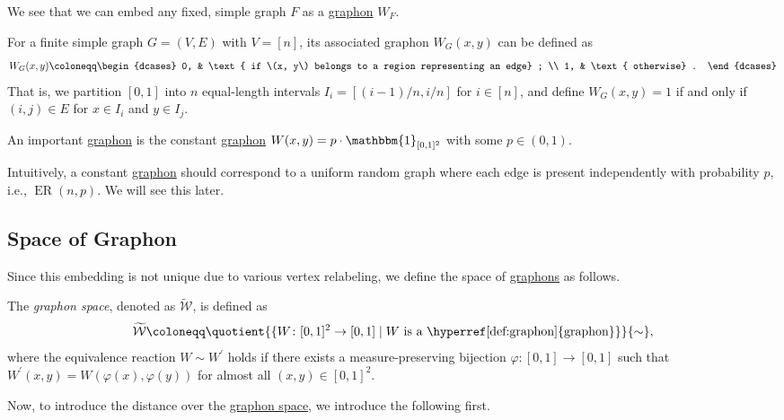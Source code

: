 We see that we can embed any fixed, simple graph \(F\) as a \hyperref[def:graphon]{graphon} \(W_F\).

\begin{eg}
	For a finite simple graph \(G = (V, E)\) with \(V = [n]\), its associated graphon \(W_G(x, y)\) can be defined as
	\[
		W_G(x, y)
		\coloneqq \begin{dcases}
			0, & \text{ if \(x, y\) belongs to a region representing an edge} ; \\
			1, & \text{ otherwise} .
		\end{dcases}
	\]
	That is, we partition \([0, 1]\) into \(n\) equal-length intervals \(I_i = [(i-1) / n, i / n]\) for \(i \in [n]\), and define \(W_G(x, y) = 1\) if and only if \((i, j) \in E\) for \(x \in I_i\) and \(y \in I_j\).
\end{eg}

\begin{eg}
	An important \hyperref[def:graphon]{graphon} is the constant \hyperref[def:graphon]{graphon} \(W(x, y) = p\cdot \mathbbm{1}_{[0, 1]^2} \) with some \(p \in (0, 1)\).
\end{eg}

Intuitively, a constant \hyperref[def:graphon]{graphon} should correspond to a uniform random graph where each edge is present independently with probability \(p\), i.e., \(\operatorname{ER}(n, p) \). We will see this later.

\subsection{Space of Graphon}
Since this embedding is not unique due to various vertex relabeling, we define the space of \hyperref[def:graphon]{graphons} as follows.

\begin{definition}\label{def:graphon-space}
	The \emph{graphon space}, denoted as \(\widetilde{\mathcal{W} } \), is defined as
	\[
		\widetilde{\mathcal{W} }
		\coloneqq \quotient{\{ W\colon [0, 1]^2 \to [0, 1] \mid W \text{ is a \hyperref[def:graphon]{graphon}} \}}{\sim } ,
	\]
	where the equivalence reaction \(W \sim W^{\prime} \) holds if there exists a measure-preserving bijection \(\varphi \colon [0, 1] \to [0, 1]\) such that \(W^{\prime} (x, y) = W(\varphi (x), \varphi (y))\) for almost all \((x, y) \in [0, 1]^2\).
\end{definition}

Now, to introduce the distance over the \hyperref[def:graphon-space]{graphon space}, we introduce the following first.

